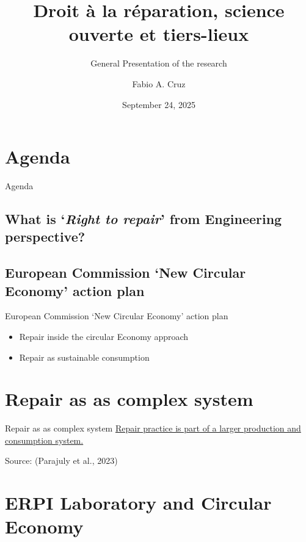 \documentclass[
  11pt,
  ignorenonframetext,
  aspectratio=169,
  c]{beamer}
\title{Droit à la réparation, science ouverte et tiers-lieux}
\subtitle{General Presentation of the research}
\author{Fabio A. Cruz}
\date{September 24, 2025}
\institute{Université de Lorraine}
\providecommand{\tightlist}{%
  \setlength{\itemsep}{0pt}\setlength{\parskip}{0pt}}\usepackage{longtable,booktabs,array}
\begin{document}
\frame{\titlepage}


\section{Agenda}\label{agenda}

\begin{frame}[plain]{Agenda}
\tableofcontents[hideallsubsections]
\end{frame}

\subsection{\texorpdfstring{What is `\emph{Right to repair}' from
Engineering
perspective?}{What is `Right to repair' from Engineering perspective?}}\label{what-is-right-to-repair-from-engineering-perspective}

\subsection{European Commission `New Circular Economy' action
plan}\label{european-commission-new-circular-economy-action-plan}

\begin{frame}{European Commission `New Circular Economy' action plan}
\begin{itemize}
\tightlist
\item
  Repair inside the circular Economy approach
\item
  Repair as sustainable consumption
\end{itemize}
\end{frame}

\section{Repair as as complex system}\label{repair-as-as-complex-system}

\begin{frame}{Repair as as complex system}
\href{figures/parajuly2023.png}{Repair practice is part of a larger
production and consumption system.}

Source: (Parajuly et al., 2023)
\end{frame}

\section{ERPI Laboratory and Circular
Economy}\label{erpi-laboratory-and-circular-economy}
\end{document}
